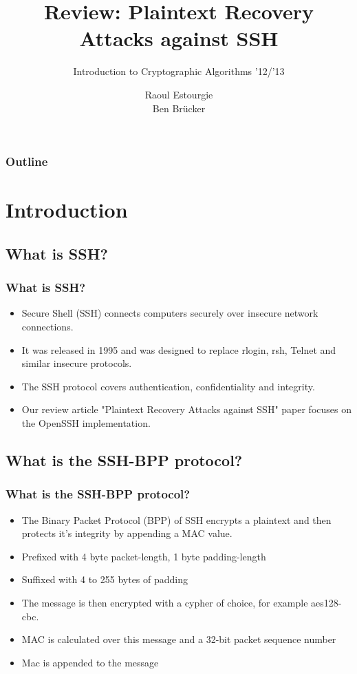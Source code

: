 \documentclass[fleqn]{beamer}
\title[Plaintext Recovery Attacks against SSH]{
Review: Plaintext Recovery Attacks against SSH}
\subtitle{Introduction to Cryptographic Algorithms '12/'13}
\author[Estourgie \& Br\"ucker]{
Raoul Estourgie\\
Ben Br\"ucker}
\institute[Radboud University Nijmegen]{
  Institute for Computing and Information Sciences \\
  Radboud University Nijmegen}
\date[Presentation 5-4-2013]
\begin{document}
  \begin{frame}
    \titlepage
  \end{frame}

  \begin{frame}
    \frametitle{Outline}
    \tableofcontents
  \end{frame}
  
\section{Introduction}

\subsection{What is SSH?}

  \begin{frame}
  \frametitle{What is SSH?}
    \begin{itemize}
      \item Secure Shell (SSH) connects computers securely over insecure network connections.
      \item It was released in 1995 and was designed to replace rlogin, rsh, Telnet and similar insecure protocols. 
      \item The SSH protocol covers authentication, confidentiality and integrity.
      \item Our review article "Plaintext Recovery Attacks against SSH" paper focuses on the OpenSSH implementation.
    \end{itemize}
  \end{frame}
  
\subsection{What is the SSH-BPP protocol?}

  \begin{frame}
  \frametitle{What is the SSH-BPP protocol?}
    \begin{itemize}
      \item The Binary Packet Protocol (BPP) of SSH encrypts a plaintext and then protects it's integrity by appending a MAC value.
      \item Prefixed with 4 byte packet-length, 1 byte padding-length
      \item Suffixed with 4 to 255 bytes of padding
      \item The message is then encrypted with a cypher of choice, for example aes128-cbc.
      \item MAC is calculated over this message and a 32-bit packet sequence number
      \item Mac is appended to the message
    \end{itemize}
  \end{frame}
    
\end{document}
